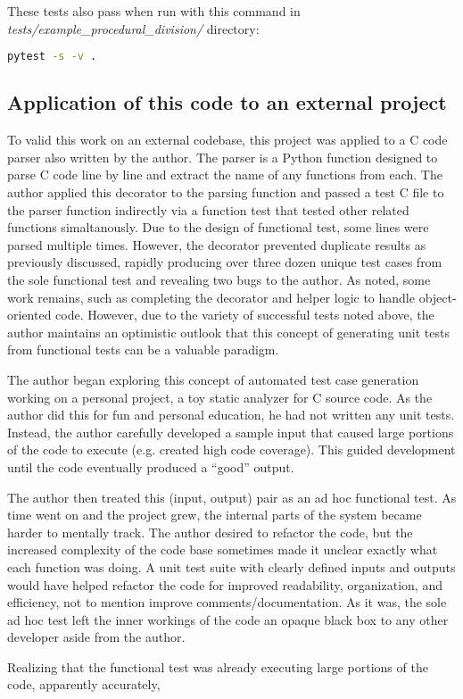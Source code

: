 These tests also pass when run with this command in 
\linebreak
\textit{tests/example\_procedural\_division/} directory:
\begin{lstlisting}[language=bash, caption={Running all generated unit
   tests for the division example}]
    pytest -s -v .
\end{lstlisting}

\subsection{Application of this code to an external project}\label{sec:eval-2}
To valid this work on an external codebase, this project was applied to a 
C code parser also written by the author.  The parser is a Python 
function designed to parse C code line by line
and extract the name of any functions from each.  The author applied this
decorator to the parsing function and passed a test C file to the parser
function indirectly via a function test that tested other related 
functions simaltanously.
%
Due to the design of functional test, some lines were parsed multiple times.  
However, the decorator prevented duplicate results as previously discussed, 
rapidly producing over three dozen unique test cases 
from the sole functional test and revealing two bugs to the author.
%
As noted, some work remains, such as completing the decorator and helper logic
to handle object-oriented code.  However, due to the variety of successful 
tests noted above, the author maintains an optimistic outlook that this concept
of generating unit tests from functional tests can be a valuable paradigm.

The author began exploring this concept of automated test case generation
working on a personal project, a toy static analyzer for C source code.  As the
author did this for fun and personal education, he had not written any unit
tests.  Instead, the author carefully developed a sample input that caused large
portions of the code to execute (e.g. created high code coverage).  This guided
development until the code eventually produced a “good” output.
  
\indent
The author then treated this (input, output) pair as an ad hoc functional test.
As time went on and the project grew, the internal parts of the system became
harder to mentally track.  The author desired to refactor the code, but the
increased complexity of the code base sometimes made it unclear exactly what
each function was doing.  A unit test suite with clearly defined inputs and
outputs would have helped refactor the code for improved readability,
organization, and efficiency, not to mention improve comments/documentation.  As
it was, the sole ad hoc test left the inner workings of the code an opaque black
box to any other developer aside from the author.

Realizing that the functional test was already executing large portions of the
code, apparently accurately, 

